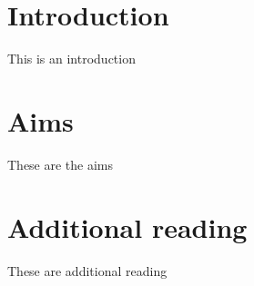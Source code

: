 \section*{Introduction}
This is an introduction

\section*{Aims}
These are the aims

\section*{Additional reading}
These are additional reading
